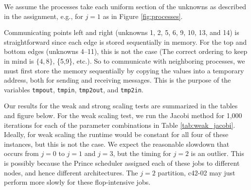 \begin{questions}
\begin{solution}
    We assume the processes take each uniform section of the unknowns as described
    in the assignment, e.g., for $j=1$ as in Figure \ref{fig:processes}.
    \begin{center}
        \label{fig:processes}
    \end{center}
    
    Communicating points left and right (unknowns 1, 2, 5, 6, 9, 10, 13, and 14)
    is straightforward since each edge is stored sequentially in memory. For the top
    and bottom edges (unknowns 4--11), this is not the case (The correct ordering to keep
    in mind is $\{4,8\}$, \{5,9\}, etc.). So to communicate with neighboring processes,
    we must first store the memory sequentially by copying the values into a temporary
    address, both for sending and receiving messages. This is the purpose of the
    variables \texttt{tmpout}, \texttt{tmpin}, \texttt{tmp2out}, and \texttt{tmp2in}. 
    
    Our results for the weak and strong scaling tests are summarized in the tables and
    figure below. For the weak scaling test, we run the Jacobi method for 1,000 iterations
    for each of the parameter combinations in Table \ref{tab:weak_jacobi}.
    Ideally, for weak scaling the runtime would be constant for all four of these
    instances, but this is not the case. We expect the reasonable slowdown that occurs
    from $j=0$ to $j=1$ and $j=3$, but the timing for $j=2$ is an outlier. This is
    possibly because the Prince scheduler assigned each of these jobs to different
    nodes, and hence different architectures. The $j=2$ partition, c42-02 may just
    perform more slowly for these flop-intensive jobs.
    

\end{solution}
\end{questions}
